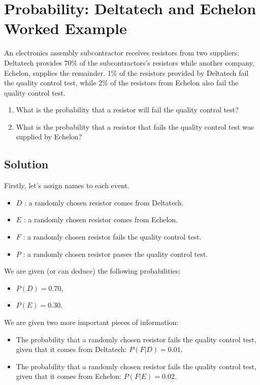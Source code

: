 \documentclass[a4paper,12pt]{article}
\begin{document}
\section*{Probability: Deltatech and Echelon Worked Example }
An electronics assembly subcontractor receives resistors from two suppliers: Deltatech provides
70\% of the subcontractors's resistors while another company, Echelon, supplies the remainder. 1\% of the resistors provided by Deltatech fail the quality control test, while 2\% of the
resistors from Echelon also fail the quality control test.

\begin{enumerate}
	\item What is the probability that a resistor will fail the quality control test?
	\item What is the probability that a resistor that fails the quality control test was supplied by Echelon?
\end{enumerate}
\subsection*{Solution}
Firstly, let's assign names to each event.
\begin{itemize}
	\item $D$ : a randomly chosen resistor comes from Deltatech.
	\item $E$ : a randomly chosen resistor comes from Echelon.
	\item $F$ : a randomly chosen resistor fails the quality control test.
	\item $P$ : a randomly chosen resistor passes the quality control test.
\end{itemize}
\bigskip
We are given (or can deduce) the following probabilities:
\begin{itemize}
	\item $P(D) = 0.70$,
	\item $P(E) = 0.30$.
\end{itemize}



\noindent We are given two more important pieces of information:
\begin{itemize}
	\item The probability that a randomly chosen resistor fails the quality control test, given that it comes from Deltatech: $P(F|D) = 0.01 $.
	\item The probability that a randomly chosen resistor fails the quality control test, given that it comes from Echelon: $P(F|E) = 0.02$.
\end{itemize}
\end{document}

